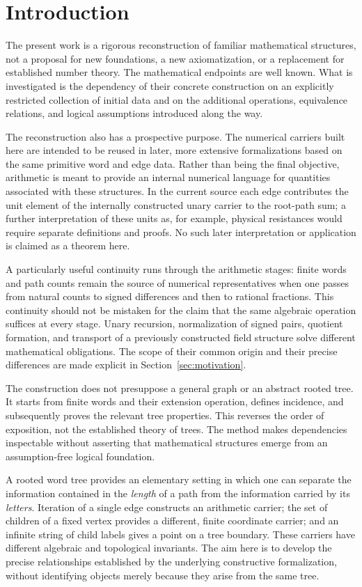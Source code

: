 \documentclass[11pt,reqno]{amsart}
\theoremstyle{definition}\newtheorem{definition}[theorem]{Definition}
\theoremstyle{remark}\newtheorem{remark}[theorem]{Remark}
\begin{document}
\clearpage
\section{Introduction}\label{sec:intro}
The present work is a rigorous reconstruction of familiar mathematical structures, not a proposal for new foundations, a new axiomatization, or a replacement for established number theory. The mathematical endpoints are well known. What is investigated is the dependency of their concrete construction on an explicitly restricted collection of initial data and on the additional operations, equivalence relations, and logical assumptions introduced along the way.

The reconstruction also has a prospective purpose. The numerical carriers built here are intended to be reused in later, more extensive formalizations based on the same primitive word and edge data. Rather than being the final objective, arithmetic is meant to provide an internal numerical language for quantities associated with these structures. In the current source each edge contributes the unit element of the internally constructed unary carrier to the root-path sum; a further interpretation of these units as, for example, physical resistances would require separate definitions and proofs. No such later interpretation or application is claimed as a theorem here.

A particularly useful continuity runs through the arithmetic stages: finite words and path counts remain the source of numerical representatives when one passes from natural counts to signed differences and then to rational fractions. This continuity should not be mistaken for the claim that the same algebraic operation suffices at every stage. Unary recursion, normalization of signed pairs, quotient formation, and transport of a previously constructed field structure solve different mathematical obligations. The scope of their common origin and their precise differences are made explicit in Section~\ref{sec:motivation}.

The construction does not presuppose a general graph or an abstract rooted tree. It starts from finite words and their extension operation, defines incidence, and subsequently proves the relevant tree properties. This reverses the order of exposition, not the established theory of trees. The method makes dependencies inspectable without asserting that mathematical structures emerge from an assumption-free logical foundation.

A rooted word tree provides an elementary setting in which one can separate the information contained in the \emph{length} of a path from the information carried by its \emph{letters}. Iteration of a single edge constructs an arithmetic carrier; the set of children of a fixed vertex provides a different, finite coordinate carrier; and an infinite string of child labels gives a point on a tree boundary. These carriers have different algebraic and topological invariants. The aim here is to develop the precise relationships established by the underlying constructive formalization, without identifying objects merely because they arise from the same tree.
\end{document}
